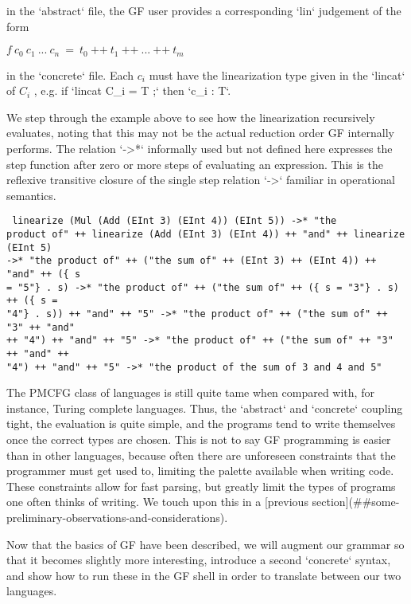 in the `abstract` file, the GF user provides a corresponding `lin` judgement of
the form

  $f \: c_0 \: c_1 \: ... \: c_n \: {=} \: t_0 \: \texttt{++} \: t_1 \:
\texttt{++} \: ... \: \texttt{++} \: t_m $

in the `concrete` file. Each $c_i$ must have the linearization type given in the
`lincat` of $C_i$ , e.g. if `lincat C_i = T ;` then `c_i : T`.

We step through the example above to see how the linearization recursively
evaluates, noting that this may not be the actual reduction order GF internally
performs. The relation `->*` informally used but not defined here expresses the
step function after zero or more steps of evaluating an expression. This is the
reflexive transitive closure of the single step relation `->` familiar in
operational semantics.

\begin{verbatim} linearize (Mul (Add (EInt 3) (EInt 4)) (EInt 5)) ->* "the
product of" ++ linearize (Add (EInt 3) (EInt 4)) ++ "and" ++ linearize (EInt 5)
->* "the product of" ++ ("the sum of" ++ (EInt 3) ++ (EInt 4)) ++ "and" ++ ({ s
= "5"} . s) ->* "the product of" ++ ("the sum of" ++ ({ s = "3"} . s) ++ ({ s =
"4"} . s)) ++ "and" ++ "5" ->* "the product of" ++ ("the sum of" ++ "3" ++ "and"
++ "4") ++ "and" ++ "5" ->* "the product of" ++ ("the sum of" ++ "3" ++ "and" ++
"4") ++ "and" ++ "5" ->* "the product of the sum of 3 and 4 and 5"
\end{verbatim}

The PMCFG class of languages is still quite tame when compared with, for
instance, Turing complete languages. Thus, the `abstract` and `concrete`
coupling tight, the evaluation is quite simple, and the programs tend to write
themselves once the correct types are chosen. This is not to say GF programming
is easier than in other languages, because often there are unforeseen
constraints that the programmer must get used to, limiting the palette available
when writing code. These constraints allow for fast parsing, but greatly limit
the types of programs one often thinks of writing. We touch upon this in a
[previous section](##some-preliminary-observations-and-considerations).

Now that the basics of GF have been described, we will augment our grammar so
that it becomes slightly more interesting, introduce a second `concrete` syntax,
and show how to run these in the GF shell in order to translate between our two
languages.

